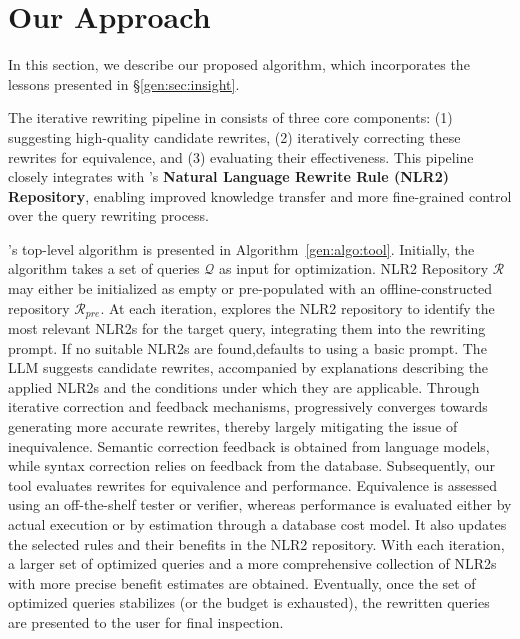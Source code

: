 \section{Our Approach}\label{gen:sec:approach}



In this section, we describe our proposed algorithm, which incorporates the lessons presented in \S\ref{gen:sec:insight}.


The iterative rewriting pipeline in \genrewrite consists of three core components: (1) suggesting high-quality candidate rewrites, (2) iteratively correcting these rewrites for equivalence, and (3) evaluating their effectiveness. This pipeline closely integrates with \genrewrite's \textbf{Natural Language Rewrite Rule (NLR2) Repository}, enabling improved knowledge transfer and more fine-grained control over the query rewriting process.


\genrewrite's top-level algorithm is presented in Algorithm~\ref{gen:algo:tool}. Initially, the algorithm takes a set of queries $\mathcal{Q}$ as input for optimization. NLR2 Repository $\mathcal{R}$ may either be initialized as empty or pre-populated with an offline-constructed repository $\mathcal{R}_{pre}$. At each iteration, \genrewrite explores the NLR2 repository to identify the most relevant NLR2s for the target query, integrating them into the rewriting prompt. If no suitable NLR2s are found,\genrewrite defaults to using a basic prompt. The LLM suggests candidate rewrites, accompanied by explanations describing the applied NLR2s and the conditions under which they are applicable. Through iterative correction and feedback mechanisms, \genrewrite progressively converges towards generating more accurate rewrites, thereby largely mitigating the issue of inequivalence. Semantic correction feedback is obtained from language models, while syntax correction relies on feedback from the database. Subsequently, our tool evaluates rewrites for equivalence and performance. Equivalence is assessed using an off-the-shelf tester or verifier, whereas performance is evaluated either by actual execution or by estimation through a database cost model. It also updates the selected rules and their benefits in the NLR2 repository. With each iteration, a larger set of optimized queries and a more comprehensive collection of NLR2s with more precise benefit estimates are obtained. Eventually, once the set of optimized queries stabilizes (or the budget is exhausted), the rewritten queries are presented to the user for final inspection.


